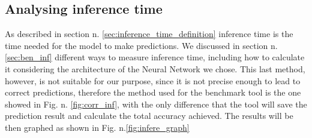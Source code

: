 \subsection{Analysing inference time}
As described in section n. \ref{sec:inference_time_definition} inference time is the time needed for the model to make predictions. We discussed in section n. \ref{sec:ben_inf} different ways to measure inference time, including how to calculate it considering the architecture of the Neural Network we chose. This last method, however, is not suitable for our purpose, since it is not precise enough to lead to correct predictions, therefore the method used for the benchmark tool is the one showed in Fig. n. \ref{fig:corr_inf}, with the only difference that the tool will save the prediction result and calculate the total accuracy achieved. The results will be then graphed as shown in Fig. n.\ref{fig:infere_graph}
